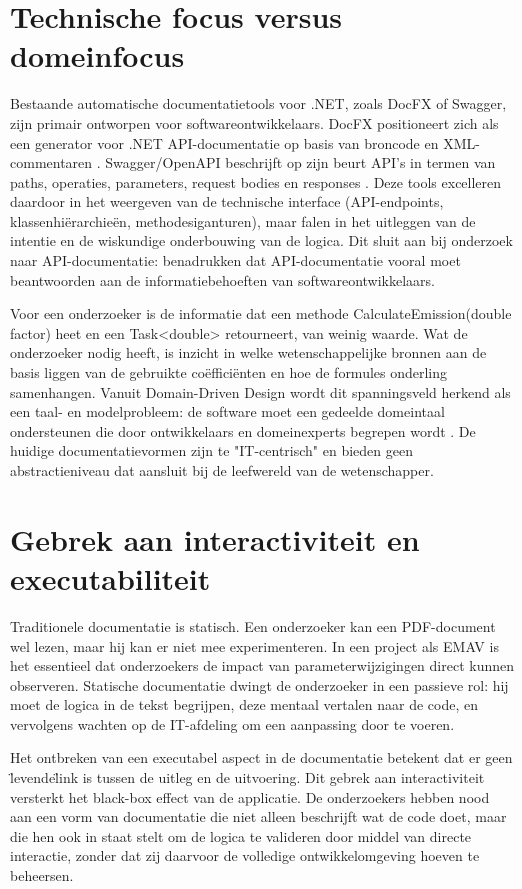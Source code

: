 \section{Technische focus versus domeinfocus}
Bestaande automatische documentatietools voor .NET, zoals DocFX of Swagger, zijn primair ontworpen voor softwareontwikkelaars. DocFX positioneert zich als een generator voor .NET API-documentatie op basis van broncode en XML-commentaren \autocite{docfx}. Swagger/OpenAPI beschrijft op zijn beurt API's in termen van paths, operaties, parameters, request bodies en responses \autocite{swaggerPathsOperations}. Deze tools excelleren daardoor in het weergeven van de technische interface (API-endpoints, klassenhiërarchieën, methodesiganturen), maar falen in het uitleggen van de intentie en de wiskundige onderbouwing van de logica. Dit sluit aan bij onderzoek naar API-documentatie: \textcite{meng2018apiDocumentation} benadrukken dat API-documentatie vooral moet beantwoorden aan de informatiebehoeften van softwareontwikkelaars.

Voor een onderzoeker is de informatie dat een methode CalculateEmission(double factor) heet en een Task<double> retourneert, van weinig waarde. Wat de onderzoeker nodig heeft, is inzicht in welke wetenschappelijke bronnen aan de basis liggen van de gebruikte coëfficiënten en hoe de formules onderling samenhangen. Vanuit Domain-Driven Design wordt dit spanningsveld herkend als een taal- en modelprobleem: de software moet een gedeelde domeintaal ondersteunen die door ontwikkelaars en domeinexperts begrepen wordt \autocite{Khononov2022}. De huidige documentatievormen zijn te "IT-centrisch" en bieden geen abstractieniveau dat aansluit bij de leefwereld van de wetenschapper.

\section{Gebrek aan interactiviteit en executabiliteit}
Traditionele documentatie is statisch. Een onderzoeker kan een PDF-document wel lezen, maar hij kan er niet mee experimenteren. In een project als EMAV is het essentieel dat onderzoekers de impact van parameterwijzigingen direct kunnen observeren. Statische documentatie dwingt de onderzoeker in een passieve rol: hij moet de logica in de tekst begrijpen, deze mentaal vertalen naar de code, en vervolgens wachten op de IT-afdeling om een aanpassing door te voeren.

Het ontbreken van een executabel aspect in de documentatie betekent dat er geen \"levende\" link is tussen de uitleg en de uitvoering. Dit gebrek aan interactiviteit versterkt het black-box effect van de applicatie. De onderzoekers hebben nood aan een vorm van documentatie die niet alleen beschrijft wat de code doet, maar die hen ook in staat stelt om de logica te valideren door middel van directe interactie, zonder dat zij daarvoor de volledige ontwikkelomgeving hoeven te beheersen.

